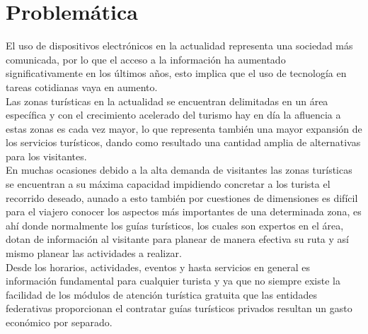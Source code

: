 \section{Problemática}

El uso de dispositivos electrónicos en la actualidad representa una sociedad más comunicada, por lo que el acceso a la información ha aumentado significativamente en los últimos años, esto implica que el uso de tecnología en tareas cotidianas vaya en aumento.\\

Las zonas turísticas en la actualidad se encuentran delimitadas en un área específica y con el crecimiento acelerado del turismo hay en día la afluencia a estas zonas es cada vez mayor, lo que representa también una mayor expansión de los servicios turísticos, dando como resultado una cantidad amplia de alternativas para los visitantes.\\

En muchas ocasiones debido a la alta demanda de visitantes las zonas turísticas se encuentran a su máxima capacidad impidiendo concretar a los turista el recorrido deseado, aunado a esto también por cuestiones de dimensiones es difícil para el viajero conocer los aspectos más importantes de una determinada zona, es ahí donde normalmente los guías turísticos, los cuales son expertos en el área, dotan de información al visitante para planear de manera efectiva su ruta y así mismo planear las actividades a realizar.\\

Desde los horarios, actividades, eventos y hasta servicios en general es información fundamental para cualquier turista y ya que no siempre existe la facilidad de los módulos de atención turística gratuita que las entidades federativas proporcionan el contratar guías turísticos privados resultan un gasto económico por separado.
